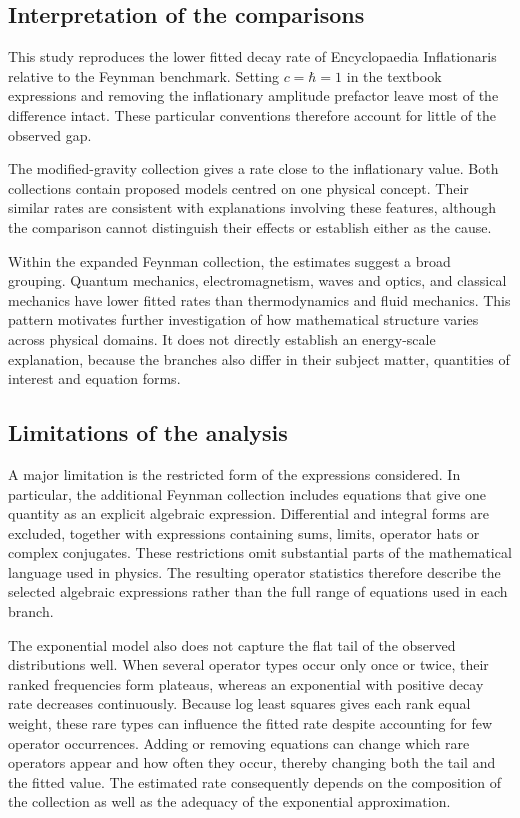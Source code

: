 \documentclass[10pt]{article}
\begin{document}
\subsection{Interpretation of the comparisons}
This study reproduces the lower fitted decay rate of Encyclopaedia Inflationaris relative to the Feynman benchmark. Setting $c=\hbar=1$ in the textbook expressions and removing the inflationary amplitude prefactor leave most of the difference intact. These particular conventions therefore account for little of the observed gap.

The modified-gravity collection gives a rate close to the inflationary value. Both collections contain proposed models centred on one physical concept. Their similar rates are consistent with explanations involving these features, although the comparison cannot distinguish their effects or establish either as the cause.

Within the expanded Feynman collection, the estimates suggest a broad grouping. Quantum mechanics, electromagnetism, waves and optics, and classical mechanics have lower fitted rates than thermodynamics and fluid mechanics. This pattern motivates further investigation of how mathematical structure varies across physical domains. It does not directly establish an energy-scale explanation, because the branches also differ in their subject matter, quantities of interest and equation forms.

\subsection{Limitations of the analysis}
A major limitation is the restricted form of the expressions considered. In particular, the additional Feynman collection includes equations that give one quantity as an explicit algebraic expression. Differential and integral forms are excluded, together with expressions containing sums, limits, operator hats or complex conjugates. These restrictions omit substantial parts of the mathematical language used in physics. The resulting operator statistics therefore describe the selected algebraic expressions rather than the full range of equations used in each branch.

The exponential model also does not capture the flat tail of the observed distributions well. When several operator types occur only once or twice, their ranked frequencies form plateaus, whereas an exponential with positive decay rate decreases continuously. Because log least squares gives each rank equal weight, these rare types can influence the fitted rate despite accounting for few operator occurrences. Adding or removing equations can change which rare operators appear and how often they occur, thereby changing both the tail and the fitted value. The estimated rate consequently depends on the composition of the collection as well as the adequacy of the exponential approximation.
\end{document}

